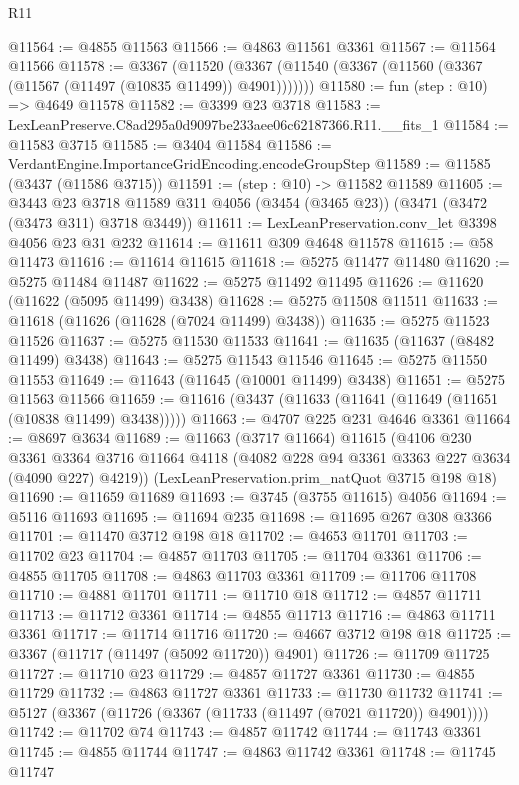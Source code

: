 \begin{lexlean}{R11}
\begin{coremodule}
@11564 := @4855 @11563
@11566 := @4863 @11561 @3361
@11567 := @11564 @11566
@11578 := @3367
    (@11520 (@3367 (@11540 (@3367 (@11560 (@3367 (@11567 (@11497 (@10835 @11499)) @4901)))))))
@11580 := fun (step : @10) => @4649 @11578
@11582 := @3399 @23 @3718
@11583 := LexLeanPreserve.C8ad295a0d9097be233aee06c62187366.R11.__fits_1
@11584 := @11583 @3715
@11585 := @3404 @11584
@11586 := VerdantEngine.ImportanceGridEncoding.encodeGroupStep
@11589 := @11585 (@3437 (@11586 @3715))
@11591 := (step : @10) -> @11582 @11589
@11605 := @3443
    @23
    @3718
    @11589
    @311
    @4056
    (@3454 (@3465 @23))
    (@3471 (@3472 (@3473 @311) @3718 @3449))
@11611 := LexLeanPreservation.conv_let @3398 @4056 @23 @31 @232
@11614 := @11611 @309 @4648 @11578
@11615 := @58 @11473
@11616 := @11614 @11615
@11618 := @5275 @11477 @11480
@11620 := @5275 @11484 @11487
@11622 := @5275 @11492 @11495
@11626 := @11620 (@11622 (@5095 @11499) @3438)
@11628 := @5275 @11508 @11511
@11633 := @11618 (@11626 (@11628 (@7024 @11499) @3438))
@11635 := @5275 @11523 @11526
@11637 := @5275 @11530 @11533
@11641 := @11635 (@11637 (@8482 @11499) @3438)
@11643 := @5275 @11543 @11546
@11645 := @5275 @11550 @11553
@11649 := @11643 (@11645 (@10001 @11499) @3438)
@11651 := @5275 @11563 @11566
@11659 := @11616 (@3437 (@11633 (@11641 (@11649 (@11651 (@10838 @11499) @3438)))))
@11663 := @4707 @225 @231 @4646 @3361
@11664 := @8697 @3634
@11689 := @11663
    (@3717 @11664)
    @11615
    (@4106
      @230
      @3361
      @3364
      @3716
      @11664
      @4118
      (@4082 @228 @94 @3361 @3363 @227 @3634 (@4090 @227) @4219))
    (LexLeanPreservation.prim_natQuot @3715 @198 @18)
@11690 := @11659 @11689
@11693 := @3745 (@3755 @11615) @4056
@11694 := @5116 @11693
@11695 := @11694 @235
@11698 := @11695 @267 @308 @3366
@11701 := @11470 @3712 @198 @18
@11702 := @4653 @11701
@11703 := @11702 @23
@11704 := @4857 @11703
@11705 := @11704 @3361
@11706 := @4855 @11705
@11708 := @4863 @11703 @3361
@11709 := @11706 @11708
@11710 := @4881 @11701
@11711 := @11710 @18
@11712 := @4857 @11711
@11713 := @11712 @3361
@11714 := @4855 @11713
@11716 := @4863 @11711 @3361
@11717 := @11714 @11716
@11720 := @4667 @3712 @198 @18
@11725 := @3367 (@11717 (@11497 (@5092 @11720)) @4901)
@11726 := @11709 @11725
@11727 := @11710 @23
@11729 := @4857 @11727 @3361
@11730 := @4855 @11729
@11732 := @4863 @11727 @3361
@11733 := @11730 @11732
@11741 := @5127 (@3367 (@11726 (@3367 (@11733 (@11497 (@7021 @11720)) @4901))))
@11742 := @11702 @74
@11743 := @4857 @11742
@11744 := @11743 @3361
@11745 := @4855 @11744
@11747 := @4863 @11742 @3361
@11748 := @11745 @11747

\end{coremodule}
\end{lexlean}
